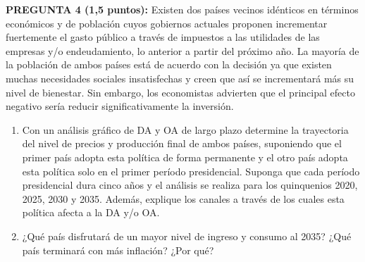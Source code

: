 \documentclass[11pt,addpoints]{article}
\begin{document}
\vspace{0.3cm}

\textbf{PREGUNTA 4 (1,5 puntos):}
Existen dos países vecinos idénticos en términos económicos y de población cuyos gobiernos actuales proponen incrementar fuertemente el gasto público a través de impuestos a las utilidades de las empresas y/o endeudamiento, lo anterior a partir del próximo año. La mayoría de la población de ambos países está de acuerdo con la decisión ya que existen muchas necesidades sociales insatisfechas y creen que así se incrementará más su nivel de bienestar. Sin embargo, los economistas advierten que el principal efecto negativo sería reducir significativamente la inversión.  

\begin{enumerate}[label=\alph*)]
    \item Con un análisis gráfico de DA y OA de largo plazo determine la trayectoria del nivel de precios y producción final de ambos países, suponiendo que el primer país adopta esta política de forma permanente y el otro país adopta esta política solo en el primer período presidencial. Suponga que cada período presidencial dura cinco años y el análisis se realiza para los quinquenios 2020, 2025, 2030 y 2035. Además, explique los canales a través de los cuales esta política afecta a la DA y/o OA.  
    \item ¿Qué país disfrutará de un mayor nivel de ingreso y consumo al 2035? ¿Qué país terminará con más inflación? ¿Por qué?  
\end{enumerate}
\end{document}
